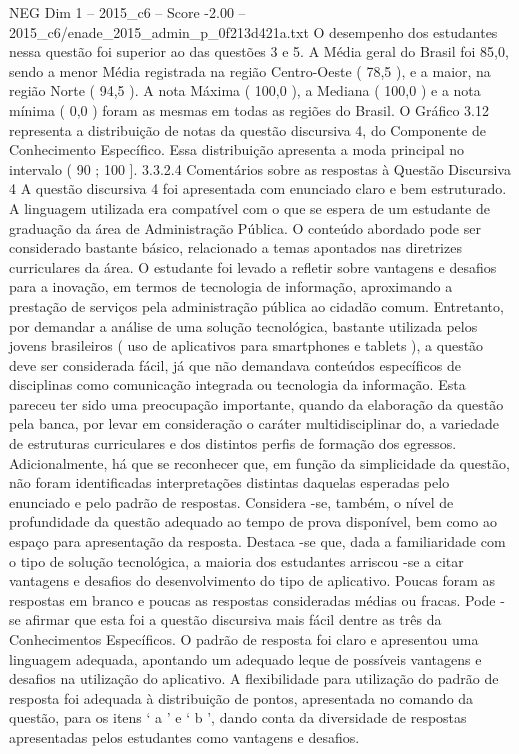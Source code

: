 \begin{textsample}{NEG Dim 1 – 2015\_c6 – Score -2.00 – 2015\_c6/enade\_2015\_admin\_p\_0f213d421a.txt}
O desempenho dos estudantes nessa questão foi superior ao das questões 3 e 5.
A Média geral do Brasil foi 85,0, sendo a menor Média registrada na região Centro-Oeste ( 78,5 ), e a maior, na região Norte ( 94,5 ).
A nota Máxima ( 100,0 ), a Mediana ( 100,0 ) e a nota mínima ( 0,0 ) foram as mesmas em todas as regiões do Brasil.
O Gráfico 3.12 representa a distribuição de notas da questão discursiva 4, do Componente de Conhecimento Específico.
Essa distribuição apresenta a moda principal no intervalo ( 90 ; 100 ]. 3.3.2.4 Comentários sobre as respostas à Questão Discursiva 4 A questão discursiva 4 foi apresentada com enunciado claro e bem estruturado.
A linguagem utilizada era compatível com o que se espera de um estudante de graduação da área de Administração Pública.
O conteúdo abordado pode ser considerado bastante básico, relacionado a temas apontados nas diretrizes curriculares da área.
O estudante foi levado a refletir sobre vantagens e desafios para a inovação, em termos de tecnologia de informação, aproximando a prestação de serviços pela administração pública ao cidadão comum.
Entretanto, por demandar a análise de uma solução tecnológica, bastante utilizada pelos jovens brasileiros ( uso de aplicativos para smartphones e tablets ), a questão deve ser considerada fácil, já que não demandava conteúdos específicos de disciplinas como comunicação integrada ou tecnologia da informação.
Esta pareceu ter sido uma preocupação importante, quando da elaboração da questão pela banca, por levar em consideração o caráter multidisciplinar do, a variedade de estruturas curriculares e dos distintos perfis de formação dos egressos.
Adicionalmente, há que se reconhecer que, em função da simplicidade da questão, não foram identificadas interpretações distintas daquelas esperadas pelo enunciado e pelo padrão de respostas.
Considera -se, também, o nível de profundidade da questão adequado ao tempo de prova disponível, bem como ao espaço para apresentação da resposta.
Destaca -se que, dada a familiaridade com o tipo de solução tecnológica, a maioria dos estudantes arriscou -se a citar vantagens e desafios do desenvolvimento do tipo de aplicativo.
Poucas foram as respostas em branco e poucas as respostas consideradas médias ou fracas.
Pode -se afirmar que esta foi a questão discursiva mais fácil dentre as três da Conhecimentos Específicos.
O padrão de resposta foi claro e apresentou uma linguagem adequada, apontando um adequado leque de possíveis vantagens e desafios na utilização do aplicativo.
A flexibilidade para utilização do padrão de resposta foi adequada à distribuição de pontos, apresentada no comando da questão, para os itens ‘ a ’ e ‘ b ’, dando conta da diversidade de respostas apresentadas pelos estudantes como vantagens e desafios.

\end{textsample}
